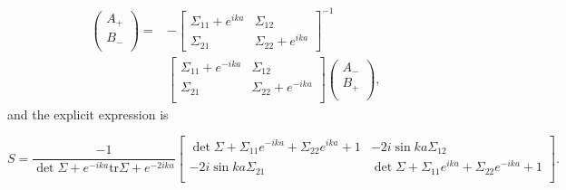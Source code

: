 \begin{equation}
\label{eq:discrete_S}
\begin{aligned}
\begin{pmatrix}
A_{+} \\
B_{-}\\
\end{pmatrix}
=&-
\begin{bmatrix}
\Sigma_{11} +e^{ika} & \Sigma_{12}\\
\Sigma_{21} & \Sigma_{22} + e^{ika}
\end{bmatrix}^{-1} \\
&\begin{bmatrix}
\Sigma_{11} + e^{-ika} & \Sigma_{12} \\
\Sigma_{21} & \Sigma_{22}  + e^{-ika}  \\
\end{bmatrix}
\begin{pmatrix}
A_{-}\\
B_{+}\\
\end{pmatrix},
\end{aligned}
\end{equation}
and the explicit expression is
\begin{widetext}
\begin{equation}
  S = \frac{-1}{ \det \Sigma  + e^{-ika} \text{tr} \Sigma   + e^{-2ika}}
\begin{bmatrix}
\det \Sigma+ \Sigma_{11} e^{-ika} + \Sigma_{22} e^{ika}+1  & -2i \sin ka \Sigma_{12}  \\
-2i \sin ka \Sigma_{21} &  \det \Sigma+ \Sigma_{11} e^{ika} + \Sigma_{22} e^{-ika}+1\\
\end{bmatrix}.
\end{equation}
\end{widetext}

